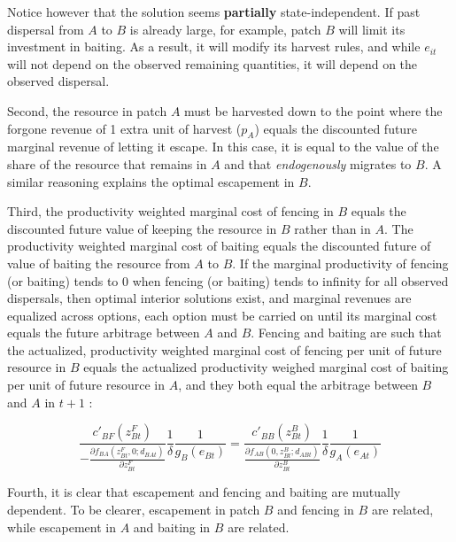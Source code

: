 \documentclass{article}
\begin{document}
Notice however that the solution seems \textbf{partially} state-independent. 
 If past dispersal from $A$ to $B$ is already large, for example, patch $B$ will limit its investment in baiting. As a result, it will modify its harvest rules, and while $e_{it}$ will not depend on the observed remaining quantities, it will depend on the observed dispersal. 

Second, the resource in patch $A$ must be harvested down to the point where the forgone revenue of 1 extra unit of harvest ($p_A$) equals the discounted future marginal revenue of letting it escape. In this case, it is equal to the value of the share of the resource that remains in $A$ and that \textit{endogenously} migrates to $B$. A similar reasoning explains the optimal escapement in $B$. 

Third, the productivity weighted marginal cost of fencing in $B$ equals the discounted future value of keeping the resource in $B$ rather than in $A$. The productivity weighted marginal cost of baiting equals the discounted future of value of baiting the resource from $A$ to $B$. If the marginal productivity of fencing (or baiting) tends to 0 when fencing (or baiting) tends to infinity for all observed dispersals, then optimal interior solutions exist, and marginal revenues are equalized across options, each option must be carried on until its marginal cost equals the future arbitrage between $A$ and $B$.  Fencing and baiting are such that the actualized, productivity weighted marginal cost of fencing per unit of future resource in $B$ equals the actualized productivity weighed marginal cost of baiting per unit of future resource in $A$, and they both equal the arbitrage between $B$ and $A$ in $t+1$ : 

$$
\frac{c'_{BF}(z_{Bt}^F)}{-\frac{\partial f_{BA}(z_{Bt}^F, 0; d_{BAt})}{\partial z_{Bt}^F}} \frac{1}{\delta} \frac{1}{g_B(e_{Bt})} = \frac{c'_{BB}(z_{Bt}^B)}{\frac{\partial f_{AB}(0, z_{Bt}^B; d_{ABt})}{\partial z_{Bt}^B}} \frac{1}{\delta} \frac{1}{g_A(e_{At})}
$$

Fourth, it is clear that escapement and fencing and baiting are mutually dependent. To be clearer, escapement in patch $B$ and fencing in $B$ are related, while escapement in $A$ and baiting in $B$ are related. 
\end{document}
